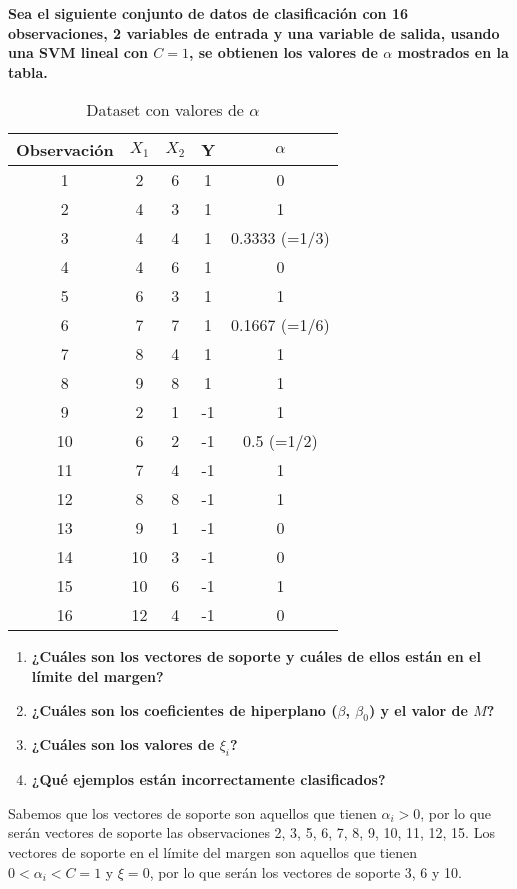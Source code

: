 \begin{example}
\textbf{Sea el siguiente conjunto de datos de clasificación con 16 observaciones, 2 variables de entrada y una variable de salida, usando una SVM lineal con $C = 1$, se obtienen los valores de $\alpha$ mostrados en la tabla.}
\begin{table}[H]
\centering
\begin{tabular}{ccccc}
\toprule
Observación & $X_1$ & $X_2$ & Y & $\alpha$ \\
\toprule
1 & 2 & 6 & 1 & 0 \\
2 & 4 & 3 & 1 & 1 \\
3 & 4 & 4 & 1 & 0.3333 (=1/3) \\
4 & 4 & 6 & 1 & 0 \\
5 & 6 & 3 & 1 & 1 \\
6 & 7 & 7 & 1 & 0.1667 (=1/6) \\
7 & 8 & 4 & 1 & 1 \\
8 & 9 & 8 & 1 & 1 \\
9 & 2 & 1 & -1 & 1 \\
10 & 6 & 2 & -1 & 0.5 (=1/2) \\
11 & 7 & 4 & -1 & 1 \\
12 & 8 & 8 & -1 & 1 \\
13 & 9 & 1 & -1 & 0 \\
14 & 10 & 3 & -1 & 0 \\
15 & 10 & 6 & -1 & 1 \\
16 & 12 & 4 & -1 & 0 \\
\toprule
\end{tabular}
\caption{Dataset con valores de $\alpha$}
\label{tab:dataset_alpha}
\end{table}
\begin{enumerate}
\item \textbf{¿Cuáles son los vectores de soporte y cuáles de ellos están en el límite del margen?}
\item \textbf{¿Cuáles son los coeficientes de hiperplano ($\beta$, $\beta_0$) y el valor de $M$?}
\item \textbf{¿Cuáles son los valores de $\xi_i$?}
\item \textbf{¿Qué ejemplos están incorrectamente clasificados?}
\end{enumerate}

Sabemos que los vectores de soporte son aquellos que tienen $\alpha_i > 0$, por lo que serán vectores de soporte las observaciones 2, 3, 5, 6, 7, 8, 9, 10, 11, 12, 15. Los vectores de soporte en el límite del margen son aquellos que tienen $0 < \alpha_i < C=1$ y $\xi = 0$, por lo que serán los vectores de soporte 3, 6 y 10. \\


\end{example}
